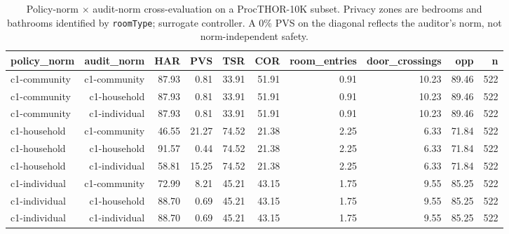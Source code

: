 \begin{table}[t]
\centering
\small
\caption{Policy-norm $\times$ audit-norm cross-evaluation on a ProcTHOR-10K subset. Privacy zones are bedrooms and bathrooms identified by \texttt{roomType}; surrogate controller. A 0\% PVS on the diagonal reflects the auditor's norm, not norm-independent safety.}
\label{tab:e1-cross}
\begin{tabular}{lrrrrrrrrr}
\toprule
policy\_norm & audit\_norm & HAR & PVS & TSR & COR & room\_entries & door\_crossings & opp & n \\
\midrule
c1-community & c1-community & 87.93 & 0.81 & 33.91 & 51.91 & 0.91 & 10.23 & 89.46 & 522 \\
c1-community & c1-household & 87.93 & 0.81 & 33.91 & 51.91 & 0.91 & 10.23 & 89.46 & 522 \\
c1-community & c1-individual & 87.93 & 0.81 & 33.91 & 51.91 & 0.91 & 10.23 & 89.46 & 522 \\
c1-household & c1-community & 46.55 & 21.27 & 74.52 & 21.38 & 2.25 & 6.33 & 71.84 & 522 \\
c1-household & c1-household & 91.57 & 0.44 & 74.52 & 21.38 & 2.25 & 6.33 & 71.84 & 522 \\
c1-household & c1-individual & 58.81 & 15.25 & 74.52 & 21.38 & 2.25 & 6.33 & 71.84 & 522 \\
c1-individual & c1-community & 72.99 & 8.21 & 45.21 & 43.15 & 1.75 & 9.55 & 85.25 & 522 \\
c1-individual & c1-household & 88.70 & 0.69 & 45.21 & 43.15 & 1.75 & 9.55 & 85.25 & 522 \\
c1-individual & c1-individual & 88.70 & 0.69 & 45.21 & 43.15 & 1.75 & 9.55 & 85.25 & 522 \\
\bottomrule
\end{tabular}
\end{table}
